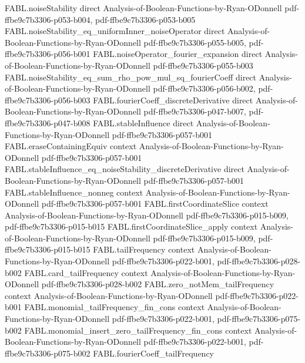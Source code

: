 \begin{theorem}
\proofstep
  {FABL.noiseStability}
  {direct}
  {Analysis-of-Boolean-Functions-by-Ryan-ODonnell}
  {pdf-ffbe9c7b3306-p053-b004,
    pdf-ffbe9c7b3306-p053-b005}
\proofstep
  {FABL.noiseStability_eq_uniformInner_noiseOperator}
  {direct}
  {Analysis-of-Boolean-Functions-by-Ryan-ODonnell}
  {pdf-ffbe9c7b3306-p055-b005,
    pdf-ffbe9c7b3306-p056-b001}
\proofstep
  {FABL.noiseOperator_fourier_expansion}
  {direct}
  {Analysis-of-Boolean-Functions-by-Ryan-ODonnell}
  {pdf-ffbe9c7b3306-p055-b003}
\proofstep
  {FABL.noiseStability_eq_sum_rho_pow_mul_sq_fourierCoeff}
  {direct}
  {Analysis-of-Boolean-Functions-by-Ryan-ODonnell}
  {pdf-ffbe9c7b3306-p056-b002,
    pdf-ffbe9c7b3306-p056-b003}
\proofstep
  {FABL.fourierCoeff_discreteDerivative}
  {direct}
  {Analysis-of-Boolean-Functions-by-Ryan-ODonnell}
  {pdf-ffbe9c7b3306-p047-b007,
    pdf-ffbe9c7b3306-p047-b008}
\proofstep
  {FABL.stableInfluence}
  {direct}
  {Analysis-of-Boolean-Functions-by-Ryan-ODonnell}
  {pdf-ffbe9c7b3306-p057-b001}
\proofstep
  {FABL.eraseContainingEquiv}
  {context}
  {Analysis-of-Boolean-Functions-by-Ryan-ODonnell}
  {pdf-ffbe9c7b3306-p057-b001}
\proofstep
  {FABL.stableInfluence_eq_noiseStability_discreteDerivative}
  {direct}
  {Analysis-of-Boolean-Functions-by-Ryan-ODonnell}
  {pdf-ffbe9c7b3306-p057-b001}
\proofstep
  {FABL.stableInfluence_nonneg}
  {context}
  {Analysis-of-Boolean-Functions-by-Ryan-ODonnell}
  {pdf-ffbe9c7b3306-p057-b001}
\proofstep
  {FABL.firstCoordinateSlice}
  {context}
  {Analysis-of-Boolean-Functions-by-Ryan-ODonnell}
  {pdf-ffbe9c7b3306-p015-b009,
    pdf-ffbe9c7b3306-p015-b015}
\proofstep
  {FABL.firstCoordinateSlice_apply}
  {context}
  {Analysis-of-Boolean-Functions-by-Ryan-ODonnell}
  {pdf-ffbe9c7b3306-p015-b009,
    pdf-ffbe9c7b3306-p015-b015}
\proofstep
  {FABL.tailFrequency}
  {context}
  {Analysis-of-Boolean-Functions-by-Ryan-ODonnell}
  {pdf-ffbe9c7b3306-p022-b001,
    pdf-ffbe9c7b3306-p028-b002}
\proofstep
  {FABL.card_tailFrequency}
  {context}
  {Analysis-of-Boolean-Functions-by-Ryan-ODonnell}
  {pdf-ffbe9c7b3306-p028-b002}
\proofstep
  {FABL.zero_notMem_tailFrequency}
  {context}
  {Analysis-of-Boolean-Functions-by-Ryan-ODonnell}
  {pdf-ffbe9c7b3306-p022-b001}
\proofstep
  {FABL.monomial_tailFrequency_fin_cons}
  {context}
  {Analysis-of-Boolean-Functions-by-Ryan-ODonnell}
  {pdf-ffbe9c7b3306-p022-b001,
    pdf-ffbe9c7b3306-p075-b002}
\proofstep
  {FABL.monomial_insert_zero_tailFrequency_fin_cons}
  {context}
  {Analysis-of-Boolean-Functions-by-Ryan-ODonnell}
  {pdf-ffbe9c7b3306-p022-b001,
    pdf-ffbe9c7b3306-p075-b002}
\proofstep
  {FABL.fourierCoeff_tailFrequency}

\end{theorem}
